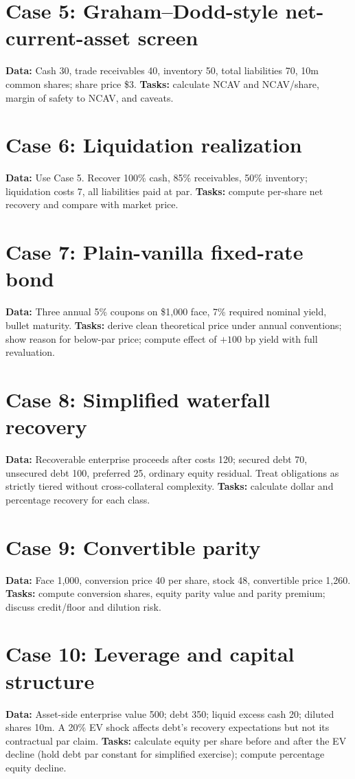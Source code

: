\documentclass[11pt,letterpaper]{article}
\begin{document}
\section{Case 5: Graham--Dodd-style net-current-asset screen}
\textbf{Data:} Cash 30, trade receivables 40, inventory 50, total liabilities 70, 10m common shares; share price \$3. \textbf{Tasks:} calculate NCAV and NCAV/share, margin of safety to NCAV, and caveats.

\section{Case 6: Liquidation realization}
\textbf{Data:} Use Case 5. Recover 100\% cash, 85\% receivables, 50\% inventory; liquidation costs 7, all liabilities paid at par. \textbf{Tasks:} compute per-share net recovery and compare with market price.

\section{Case 7: Plain-vanilla fixed-rate bond}
\textbf{Data:} Three annual 5\% coupons on \$1,000 face, 7\% required nominal yield, bullet maturity. \textbf{Tasks:} derive clean theoretical price under annual conventions; show reason for below-par price; compute effect of $+100$ bp yield with full revaluation.

\section{Case 8: Simplified waterfall recovery}
\textbf{Data:} Recoverable enterprise proceeds after costs 120; secured debt 70, unsecured debt 100, preferred 25, ordinary equity residual. Treat obligations as strictly tiered without cross-collateral complexity. \textbf{Tasks:} calculate dollar and percentage recovery for each class.

\section{Case 9: Convertible parity}
\textbf{Data:} Face 1,000, conversion price 40 per share, stock 48, convertible price 1,260. \textbf{Tasks:} compute conversion shares, equity parity value and parity premium; discuss credit/floor and dilution risk.

\section{Case 10: Leverage and capital structure}
\textbf{Data:} Asset-side enterprise value 500; debt 350; liquid excess cash 20; diluted shares 10m. A 20\% EV shock affects debt's recovery expectations but not its contractual par claim. \textbf{Tasks:} calculate equity per share before and after the EV decline (hold debt par constant for simplified exercise); compute percentage equity decline.
\end{document}
